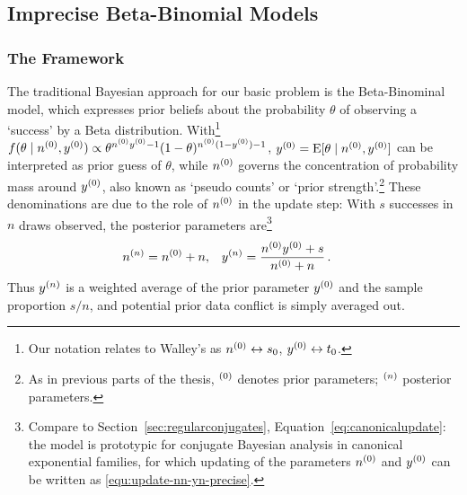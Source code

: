 \subsection{Imprecise Beta-Binomial Models}
\label{sec:ibbm}

\subsubsection{The Framework}
\label{sec:ibbm-framework}


The traditional Bayesian approach for our basic problem is the Beta-Binominal model, which expresses prior
beliefs about the probability $\theta$ of observing a `success' by a Beta
distribution. With\footnote{Our notation relates to
Walley's \parencite*{1991:walley} as $n^{(0)} \leftrightarrow s_0$, $y^{(0)} \leftrightarrow t_0$.}
$f(\theta\mid n^{(0)}, y^{(0)}) \propto \theta^{n^{(0)}y^{(0)} -1} (1-\theta)^{n^{(0)}(1-y^{(0)})-1}$,
$y^{(0)} = \operatorname{E}[\theta\mid n^{(0)},y^{(0)}]$ can be interpreted as prior guess of
$\theta$, while $n^{(0)}$ governs the concentration of
probability mass around $y^{(0)}$, also known as `pseudo counts' or
`prior strength'.\footnote{As in previous parts of the thesis, ${}^{(0)}$ denotes prior parameters; ${}^{(n)}$ posterior parameters.}
These denominations are due to the
role of $n^{(0)}$ in the update step: With $s$ successes in $n$ draws observed, the
posterior parameters are\footnote{Compare to Section~\ref{sec:regularconjugates},
Equation~\eqref{eq:canonicalupdate}:
the model is prototypic for conjugate Bayesian
analysis in canonical exponential families, for which updating
of the parameters $n^{(0)}$ and $y^{(0)}$ can be
written as \eqref{equ:update-nn-yn-precise}.} %
\begin{align}\label{equ:update-nn-yn-precise}
n^{(n)} &= n^{(0)} + n, & y^{(n)} &= \frac{n^{(0)}y^{(0)} + s}{n^{(0)} + n}\,.
\end{align}
Thus $y^{(n)}$ is a weighted average of the prior parameter $y^{(0)}$ and
the sample proportion $s/n$, and potential prior data conflict is simply averaged out.

